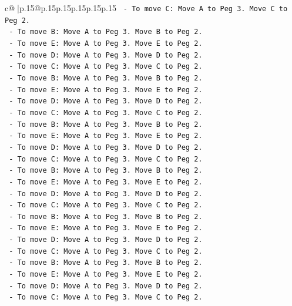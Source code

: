 \documentclass{article}
\begin{document}
{\begin{supertabular}{c@{$\;$}|p{.15\linewidth}@{}p{.15\linewidth}p{.15\linewidth}p{.15\linewidth}p{.15\linewidth}p{.15\linewidth}}
{{{\texttt{    {-}   To move C: Move A to Peg 3. Move C to Peg 2.} \\
\texttt{    {-}   To move B: Move A to Peg 3. Move B to Peg 2.} \\
\texttt{    {-}   To move E: Move A to Peg 3. Move E to Peg 2.} \\
\texttt{    {-}   To move D: Move A to Peg 3. Move D to Peg 2.} \\
\texttt{    {-}   To move C: Move A to Peg 3. Move C to Peg 2.} \\
\texttt{    {-}   To move B: Move A to Peg 3. Move B to Peg 2.} \\
\texttt{    {-}   To move E: Move A to Peg 3. Move E to Peg 2.} \\
\texttt{    {-}   To move D: Move A to Peg 3. Move D to Peg 2.} \\
\texttt{    {-}   To move C: Move A to Peg 3. Move C to Peg 2.} \\
\texttt{    {-}   To move B: Move A to Peg 3. Move B to Peg 2.} \\
\texttt{    {-}   To move E: Move A to Peg 3. Move E to Peg 2.} \\
\texttt{    {-}   To move D: Move A to Peg 3. Move D to Peg 2.} \\
\texttt{    {-}   To move C: Move A to Peg 3. Move C to Peg 2.} \\
\texttt{    {-}   To move B: Move A to Peg 3. Move B to Peg 2.} \\
\texttt{    {-}   To move E: Move A to Peg 3. Move E to Peg 2.} \\
\texttt{    {-}   To move D: Move A to Peg 3. Move D to Peg 2.} \\
\texttt{    {-}   To move C: Move A to Peg 3. Move C to Peg 2.} \\
\texttt{    {-}   To move B: Move A to Peg 3. Move B to Peg 2.} \\
\texttt{    {-}   To move E: Move A to Peg 3. Move E to Peg 2.} \\
\texttt{    {-}   To move D: Move A to Peg 3. Move D to Peg 2.} \\
\texttt{    {-}   To move C: Move A to Peg 3. Move C to Peg 2.} \\
\texttt{    {-}   To move B: Move A to Peg 3. Move B to Peg 2.} \\
\texttt{    {-}   To move E: Move A to Peg 3. Move E to Peg 2.} \\
\texttt{    {-}   To move D: Move A to Peg 3. Move D to Peg 2.} \\
\texttt{    {-}   To move C: Move A to Peg 3. Move C to Peg 2.} \\
}}}
\end{supertabular}}
\end{document}
